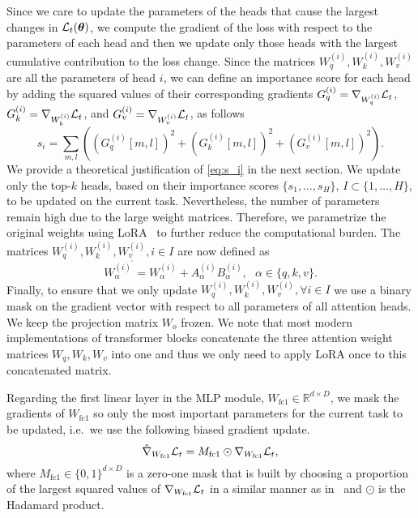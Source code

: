 Since we care to update the parameters of the heads that cause the largest changes in  $\mathcal{L}_t(\boldsymbol{\theta})$, we compute the gradient of the loss with respect to the parameters of each head and then we update only those heads with the largest cumulative contribution to the loss change. Since the matrices $W_q^{(i)},  W_k^{(i)},  W_v^{(i)}$ are all the parameters of head $i$, we can define an importance score for each head by adding the squared values of their corresponding gradients $G_q^{(i)} = \nabla_{W_q^{(i)}} \mathcal{L}_t$, $G_k^{(i)} = \nabla_{W_k^{(i)}} \mathcal{L}_t$, and $G_v^{(i)} = \nabla_{W_v^{(i)}} \mathcal{L}_t$, as follows
\begin{equation}
    s_i = \sum_{m,l} \left( (G_q^{(i)}[m,l])^2 + (G_k^{(i)}[m,l])^2 + (G_v^{(i)}[m,l])^2 \right). \label{eq:s_i} 
\end{equation}
We provide a theoretical justification of \eqref{eq:s_i} in the next section. We update only the top-$k$ heads, based on their importance scores $\{s_1, \ldots, s_H \}$, $I \subset \{1, \ldots, H \}$, to be updated on the current task. Nevertheless, the number of parameters remain high due to the large weight matrices. Therefore, we parametrize the original weights using LoRA~\cite{hu2021lora} to further reduce the computational burden. The matrices $W_q^{(i)}, W_k^{(i)}, W_v^{(i)}, i \in I$ are now defined as
\begin{equation}
    W_{\alpha}^{(i)^{\prime}} = W_{\alpha}^{(i)} + A_{\alpha}^{(i)} B_{\alpha}^{(i)},~~~\alpha \in \{q, k, v \}. \label{eq:lora_attn_weights}
\end{equation}
Finally, to ensure that we only update $W_q^{(i)},  W_k^{(i)},  W_v^{(i)}, \forall i \in I$ we use a binary mask on the gradient vector with respect to all parameters of all attention heads. We keep the projection matrix $W_o$ frozen. We note that most modern implementations of transformer blocks concatenate the three attention weight matrices $W_q, W_k, W_v$ into one and thus we only need to apply LoRA once to this concatenated matrix.

Regarding the first linear layer in the MLP module, $W_{\text{fc1}} \in \mathbb{R}^{d \times D}$, we mask the gradients of $W_{\text{fc1}}$ so only the most important parameters for the current task to be updated, i.e.~we use the following biased gradient update.
\begin{equation}
\hat{\nabla}_{W_{\text{fc1}}} \mathcal{L}_t = M_{\text{fc1}} \odot \nabla_{W_{\text{fc1}}} \mathcal{L}_t,
\end{equation}
where  $M_{\text{fc1}} \in \{0, 1 \}^{d \times D}$ is a zero-one mask that is built by choosing a proportion of the largest squared values of $\nabla_{W_{\text{fc1}}} \mathcal{L}_t$ in a similar manner as in~\cite{zhang2024overcoming} and $\odot$ is the Hadamard product.

